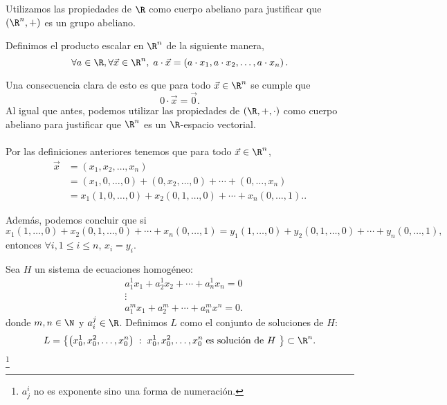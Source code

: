 Utilizamos las propiedades de $\displaystyle \R $ como cuerpo abeliano para justificar que $\displaystyle \left(\R^{n}, +\right) $ es un grupo abeliano. 

\begin{fdefinition}[]
\normalfont Definimos el producto escalar en $\displaystyle \R^{n} $ de la siguiente manera,
\[\forall a \in \R, \forall \vec{x} \in \R^{n}, \; a \cdot \vec{x} = \left(a\cdot x_{1}, a\cdot x_{2}, \ldots, a\cdot x_{n}\right) .\]
\end{fdefinition}

Una consecuencia clara de esto es que para todo $\displaystyle \vec{x}\in \R^{n} $ se cumple que 
\[0 \cdot \vec{x} = \vec{0} .\]
Al igual que antes, podemos utilizar las propiedades de $\displaystyle \left(\R, +, \cdot\right) $ como cuerpo abeliano para justificar que $\displaystyle \R^{n} $ es un $\displaystyle \R $-espacio vectorial. \\ \\
Por las definiciones anteriores tenemos que para todo $\displaystyle \vec{x} \in \R^{n} $, 
\[
\begin{split}
 \vec{x} & = \left(x_{1}, x_{2}, \ldots, x_{n}\right) \\
& = \left(x_{1}, 0, \ldots, 0\right)+\left(0, x_{2}, \ldots, 0\right) + \cdots + \left(0, \ldots, x_{n}\right) \\
& = x_{1}\left(1, 0, \ldots, 0\right)+x_{2}\left(0,1, \ldots, 0\right) + \cdots + x_{n}\left(0, \ldots, 1\right)..
\end{split}
\]

Además, podemos concluir que si 
\[x_{1}\left(1, \ldots, 0\right)+x_{2}\left(0,1, \ldots,0\right)+\cdots+x_{n}\left(0, \ldots , 1\right) = y_{1}\left(1, \ldots, 0\right)+y_{2}\left(0,1, \ldots,0\right)+\cdots+y_{n}\left(0, \ldots , 1\right) ,\]
entonces $\displaystyle \forall i, 1\leq i \leq n $, $\displaystyle x_{i}=y_{i} $. 

\begin{fdefinition}
\normalfont Sea $\displaystyle H $ un sistema de ecuaciones homogéneo:
\[
\begin{split}
& a_{1}^{1}x_{1}+a_{2}^{1}x_{2}+\cdots+a_{n}^{1}x_{n}=0 \\
& \vdots \\
& a^{m}_{1}x_{1}+a^{m}_{2}+\cdots+a^{m}_{n}x^{n}=0. 
\end{split}
\]
donde $\displaystyle m,n \in \N $ y $\displaystyle a^{j}_{i}\in\R $. Definimos $\displaystyle L $ como el conjunto de soluciones de $\displaystyle H $:
\[L = \left\{  \left(x_{0}^{1}, x_{0}^{2}, \ldots, x^{n}_{0}\right)\; : \; x_{0}^{1}, x^{2}_{0}, \ldots, x^{n}_{0}\; \text{es solución de $\displaystyle H $ }\right\} \subset \R^{n} .\]
\footnote{ $\displaystyle a^{i}_{j}  $ no es exponente sino una forma de numeración.} 
\end{fdefinition}

